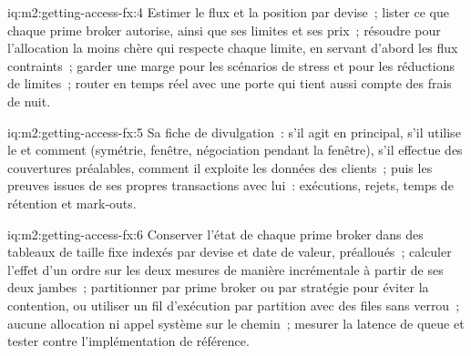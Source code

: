 \begin{solution}{iq:m2:getting-access-fx:4}
Estimer le flux et la position par devise~; lister ce que chaque prime broker autorise, ainsi que
ses limites et ses prix~; résoudre pour l'allocation la moins chère qui respecte chaque limite,
en servant d'abord les flux contraints~; garder une marge pour les scénarios de stress et pour les
réductions de limites~; router en temps réel avec une porte qui tient aussi compte des frais de nuit.
\end{solution}

\begin{solution}{iq:m2:getting-access-fx:5}
Sa fiche de divulgation~: s'il agit en principal, s'il utilise le  et comment
(symétrie, fenêtre, négociation pendant la fenêtre), s'il effectue des couvertures préalables, comment
il exploite les données des clients~; puis les preuves issues de ses propres transactions avec lui~: exécutions,
rejets, temps de rétention et mark-outs.
\end{solution}

\begin{solution}{iq:m2:getting-access-fx:6}
Conserver l'état de chaque prime broker dans des tableaux de taille fixe indexés par devise et date
de valeur, préalloués~; calculer l'effet d'un ordre sur les deux mesures de manière incrémentale à partir de
ses deux jambes~; partitionner par prime broker ou par stratégie pour éviter la contention, ou utiliser un fil
d'exécution par partition avec des files sans verrou~; aucune allocation ni appel système sur le chemin~; mesurer
la latence de queue et tester contre l'implémentation de référence.
\end{solution}
